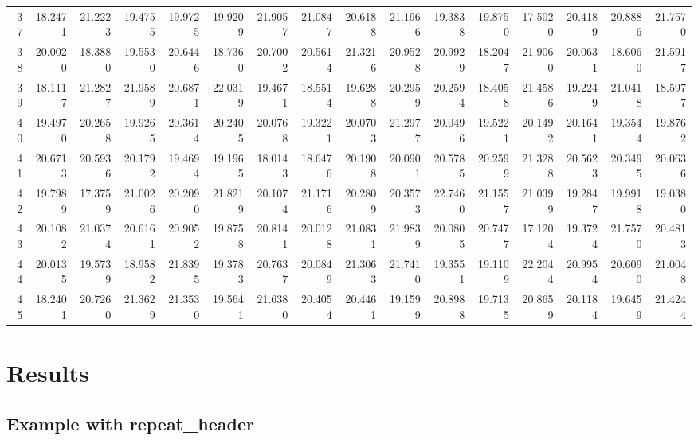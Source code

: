\documentclass[12pt]{article}\usepackage[]{graphicx}\usepackage[]{color}
\begin{document}
\begin{landscape}
\begin{longtable}[t]{rrrrrrrrrrrrrrrr}
37 & 18.2471 & 21.2223 & 19.4755 & 19.9725 & 19.9209 & 21.9057 & 21.0847 & 20.6188 & 21.1966 & 19.3838 & 19.8750 & 17.5020 & 20.4189 & 20.8886 & 21.7570\\
38 & 20.0020 & 18.3880 & 19.5530 & 20.6446 & 18.7360 & 20.7002 & 20.5614 & 21.3216 & 20.9528 & 20.9929 & 18.2047 & 21.9060 & 20.0631 & 18.6060 & 21.5917\\
39 & 18.1117 & 21.2827 & 21.9589 & 20.6871 & 22.0319 & 19.4671 & 18.5514 & 19.6288 & 20.2959 & 20.2594 & 18.4058 & 21.4586 & 19.2249 & 21.0418 & 18.5977\\
40 & 19.4970 & 20.2658 & 19.9265 & 20.3614 & 20.2405 & 20.0768 & 19.3221 & 20.0703 & 21.2977 & 20.0496 & 19.5221 & 20.1492 & 20.1641 & 19.3544 & 19.8762\\
41 & 20.6713 & 20.5936 & 20.1792 & 19.4694 & 19.1965 & 18.0143 & 18.6476 & 20.1908 & 20.0901 & 20.5785 & 20.2599 & 21.3288 & 20.5623 & 20.3495 & 20.0636\\
42 & 19.7989 & 17.3759 & 21.0026 & 20.2090 & 21.8219 & 20.1074 & 21.1716 & 20.2809 & 20.3573 & 22.7460 & 21.1557 & 21.0399 & 19.2847 & 19.9918 & 19.0380\\
43 & 20.1082 & 21.0374 & 20.6161 & 20.9052 & 19.8758 & 20.8141 & 20.0128 & 21.0831 & 21.9839 & 20.0805 & 20.7477 & 17.1204 & 19.3724 & 21.7570 & 20.4813\\
44 & 20.0135 & 19.5739 & 18.9582 & 21.8395 & 19.3783 & 20.7637 & 20.0849 & 21.3063 & 21.7410 & 19.3551 & 19.1109 & 22.2044 & 20.9954 & 20.6090 & 21.0048\\
45 & 18.2401 & 20.7260 & 21.3629 & 21.3530 & 19.5641 & 21.6380 & 20.4054 & 20.4461 & 19.1599 & 20.8988 & 19.7135 & 20.8659 & 20.1184 & 19.6459 & 21.4244\\*
\end{longtable}
\end{landscape}
\endgroup{}

\clearpage

\hypertarget{results}{%
\section{Results}\label{results}}

\hypertarget{example-with-repeat_header}{%
\subsection{Example with repeat\_header}\label{example-with-repeat_header}}
\end{document}
